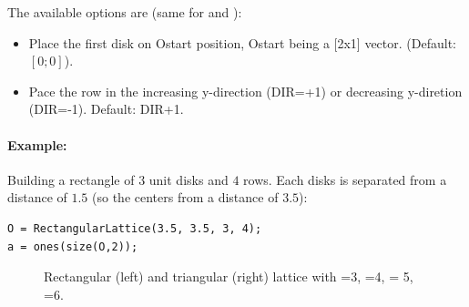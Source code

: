 The available options are (same for  and ):
\begin{itemize}
\item {}
Place the first disk on Ostart position, Ostart being a [2x1] vector. (Default: $[0;0]$).
 \item {}
Pace the row in the increasing y-direction (DIR=+1) or decreasing y-diretion (DIR=-1). Default: DIR+1.
\end{itemize}

\paragraph{Example:} Building a rectangle of $3$ unit disks and $4$ rows. Each disks is separated from a distance of $1.5$ (so the centers from a distance of $3.5$):
\begin{lstlisting}
O = RectangularLattice(3.5, 3.5, 3, 4);
a = ones(size(O,2));
\end{lstlisting}

\begin{figure}
\centering
{}\quad{}
\caption{Rectangular (left) and triangular (right) lattice with =3, =4,  = 5, =6.}
\label{fig:lattices}
\end{figure}


